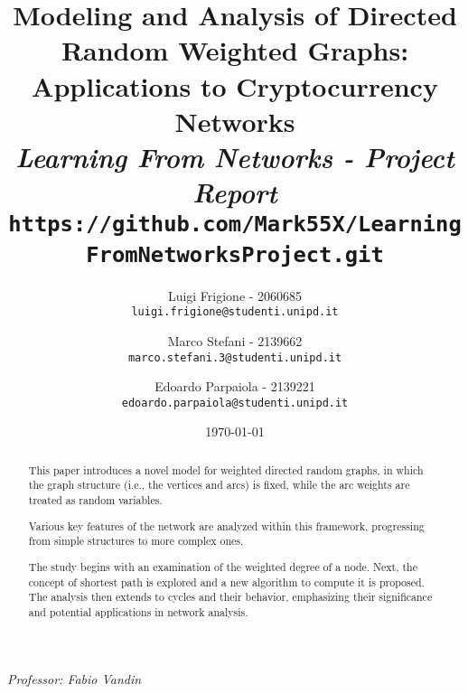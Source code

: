 \title{
	\vspace{-2cm}
    \textbf{Modeling and Analysis of Directed Random Weighted Graphs: Applications to Cryptocurrency Networks}\\[.4cm]
    
    {\large\emph{Learning From Networks - Project Report}}
    {\large\texttt{https://github.com/Mark55X/LearningFromNetworksProject.git}}
}

\author{
  Luigi Frigione - 2060685\\
  \texttt{\small{luigi.frigione@studenti.unipd.it}}
  \and
  Marco Stefani - 2139662\\
  \texttt{\small{marco.stefani.3@studenti.unipd.it}}
  \and
  Edoardo Parpaiola - 2139221\\
  \texttt{\small{edoardo.parpaiola@studenti.unipd.it}}
}

\date{\today}

\maketitle

\begin{abstract}
This paper introduces a novel model for weighted directed random graphs, in which the graph structure (i.e., the vertices and arcs) is fixed, while the arc weights are treated as random variables.

Various key features of the network are analyzed within this framework, progressing from simple structures to more complex ones.

The study begins with an examination of the weighted degree of a node\cite{gonzalez2010an}.
Next, the concept of shortest path is explored and a new algorithm to compute it is proposed.
The analysis then extends to cycles and their behavior, emphasizing their
significance and potential applications in network analysis.
\end{abstract}

\vfill
{
    \emph{Professor: Fabio Vandin}
}

\newpage

\tableofcontents


